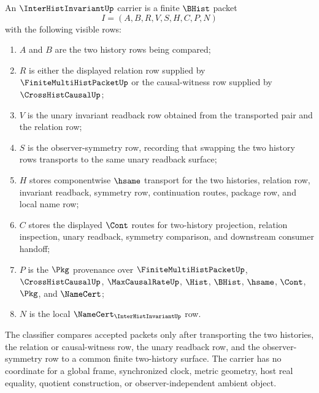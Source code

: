 \begin{definition}
\label{def:interhist-invariant-carrier}
An $\InterHistInvariantUp$ carrier is a finite $\BHist$ packet
$$
I=(A,B,R,V,S,H,C,P,N)
$$
with the following visible rows:
\begin{enumerate}
\item $A$ and $B$ are the two history rows being compared;
\item $R$ is either the displayed relation row supplied by $\FiniteMultiHistPacketUp$ or the causal-witness row supplied by $\CrossHistCausalUp$;
\item $V$ is the unary invariant readback row obtained from the transported pair and the relation row;
\item $S$ is the observer-symmetry row, recording that swapping the two history rows transports to the same unary readback surface;
\item $H$ stores componentwise $\hsame$ transport for the two histories, relation row, invariant readback, symmetry row, continuation routes, package row, and local name row;
\item $C$ stores the displayed $\Cont$ routes for two-history projection, relation inspection, unary readback, symmetry comparison, and downstream consumer handoff;
\item $P$ is the $\Pkg$ provenance over $\FiniteMultiHistPacketUp$, $\CrossHistCausalUp$, $\MaxCausalRateUp$, $\Hist$, $\BHist$, $\hsame$, $\Cont$, $\Pkg$, and $\NameCert$;
\item $N$ is the local $\NameCert_{\InterHistInvariantUp}$ row.
\end{enumerate}
The classifier compares accepted packets only after transporting the two histories, the relation or causal-witness row, the unary readback row, and the observer-symmetry row to a common finite two-history surface. The carrier has no coordinate for a global frame, synchronized clock, metric geometry, host real equality, quotient construction, or observer-independent ambient object.
\end{definition}

